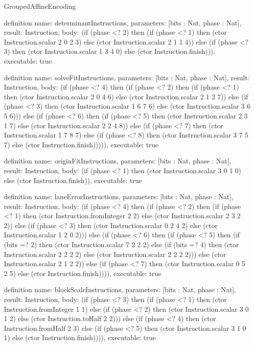 \begin{lexlean}{GroupedAffineEncoding}
\begin{semanticmodule}
definition{
  name: determinantInstructions,
  parameters: [bits : Nat, phase : Nat],
  result: Instruction,
  body: (if (phase <? 2) then (if (phase <? 1) then (ctor Instruction.scalar 2 0 2 3) else (ctor Instruction.scalar 2 1 1 4)) else (if (phase <? 3) then (ctor Instruction.scalar 1 3 4 0) else (ctor Instruction.finish))),
  executable: true
}

definition{
  name: solveFitInstructions,
  parameters: [bits : Nat, phase : Nat],
  result: Instruction,
  body: (if (phase <? 4) then (if (phase <? 2) then (if (phase <? 1) then (ctor Instruction.scalar 2 0 4 6) else (ctor Instruction.scalar 2 1 2 7)) else (if (phase <? 3) then (ctor Instruction.scalar 1 6 7 6) else (ctor Instruction.scalar 3 6 5 6))) else (if (phase <? 6) then (if (phase <? 5) then (ctor Instruction.scalar 2 3 1 7) else (ctor Instruction.scalar 2 2 4 8)) else (if (phase <? 7) then (ctor Instruction.scalar 1 7 8 7) else (if (phase <? 8) then (ctor Instruction.scalar 3 7 5 7) else (ctor Instruction.finish))))),
  executable: true
}

definition{
  name: originFitInstructions,
  parameters: [bits : Nat, phase : Nat],
  result: Instruction,
  body: (if (phase <? 1) then (ctor Instruction.scalar 3 0 1 0) else (ctor Instruction.finish)),
  executable: true
}

definition{
  name: laneErrorInstructions,
  parameters: [bits : Nat, phase : Nat],
  result: Instruction,
  body: (if (phase <? 4) then (if (phase <? 2) then (if (phase <? 1) then (ctor Instruction.fromInteger 2 2) else (ctor Instruction.scalar 2 3 2 2)) else (if (phase <? 3) then (ctor Instruction.scalar 0 2 4 2) else (ctor Instruction.scalar 1 2 0 2))) else (if (phase <? 6) then (if (phase <? 5) then (if (bits =? 2) then (ctor Instruction.scalar 7 2 2 2) else (if (bits =? 4) then (ctor Instruction.scalar 2 2 2 2) else (ctor Instruction.scalar 2 2 2 2))) else (ctor Instruction.scalar 2 1 2 2)) else (if (phase <? 7) then (ctor Instruction.scalar 0 5 2 5) else (ctor Instruction.finish)))),
  executable: true
}

definition{
  name: blockScaleInstructions,
  parameters: [bits : Nat, phase : Nat],
  result: Instruction,
  body: (if (phase <? 3) then (if (phase <? 1) then (ctor Instruction.fromInteger 1 1) else (if (phase <? 2) then (ctor Instruction.scalar 3 0 1 2) else (ctor Instruction.toHalf 2 2))) else (if (phase <? 4) then (ctor Instruction.fromHalf 2 3) else (if (phase <? 5) then (ctor Instruction.scalar 3 1 0 1) else (ctor Instruction.finish)))),
  executable: true
}


\end{semanticmodule}
\end{lexlean}
